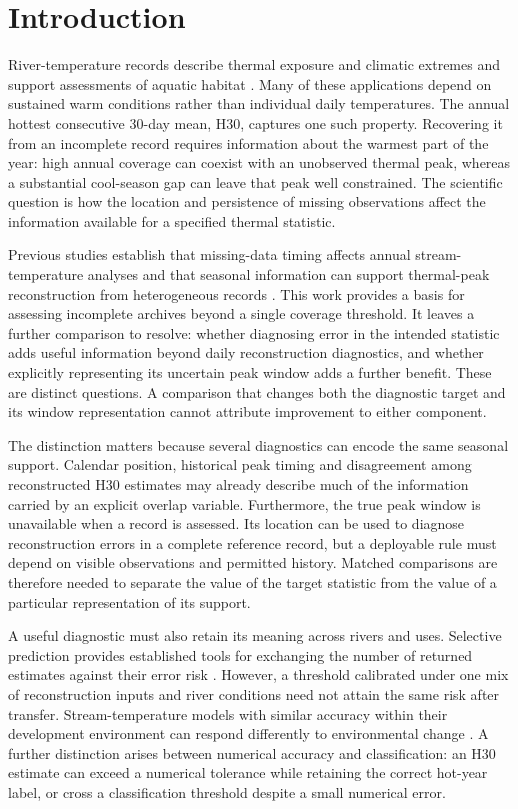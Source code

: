 \documentclass[draft]{agujournal2025}
\begin{document}
\section{Introduction}
River-temperature records describe thermal exposure and climatic extremes and support assessments of aquatic habitat \cite{caissie2006}. Many of these applications depend on sustained warm conditions rather than individual daily temperatures. The annual hottest consecutive 30-day mean, H30, captures one such property. Recovering it from an incomplete record requires information about the warmest part of the year: high annual coverage can coexist with an unobserved thermal peak, whereas a substantial cool-season gap can leave that peak well constrained. The scientific question is how the location and persistence of missing observations affect the information available for a specified thermal statistic.

Previous studies establish that missing-data timing affects annual stream-temperature analyses \cite{johnson2021} and that seasonal information can support thermal-peak reconstruction from heterogeneous records \cite{beaufort2022}. This work provides a basis for assessing incomplete archives beyond a single coverage threshold. It leaves a further comparison to resolve: whether diagnosing error in the intended statistic adds useful information beyond daily reconstruction diagnostics, and whether explicitly representing its uncertain peak window adds a further benefit. These are distinct questions. A comparison that changes both the diagnostic target and its window representation cannot attribute improvement to either component.

The distinction matters because several diagnostics can encode the same seasonal support. Calendar position, historical peak timing and disagreement among reconstructed H30 estimates may already describe much of the information carried by an explicit overlap variable. Furthermore, the true peak window is unavailable when a record is assessed. Its location can be used to diagnose reconstruction errors in a complete reference record, but a deployable rule must depend on visible observations and permitted history. Matched comparisons are therefore needed to separate the value of the target statistic from the value of a particular representation of its support.

A useful diagnostic must also retain its meaning across rivers and uses. Selective prediction provides established tools for exchanging the number of returned estimates against their error risk \cite{geifman2017,angelopoulos2025}. However, a threshold calibrated under one mix of reconstruction inputs and river conditions need not attain the same risk after transfer. Stream-temperature models with similar accuracy within their development environment can respond differently to environmental change \cite{topp2023}. A further distinction arises between numerical accuracy and classification: an H30 estimate can exceed a numerical tolerance while retaining the correct hot-year label, or cross a classification threshold despite a small numerical error.
\end{document}
